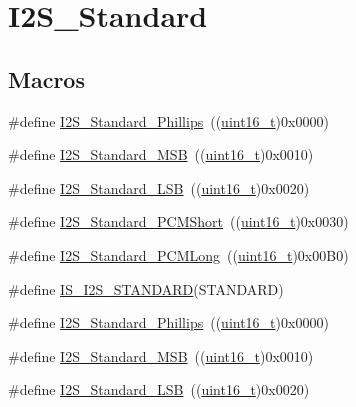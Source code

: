 \hypertarget{group___i2_s___standard}{}\section{I2\+S\+\_\+\+Standard}
\label{group___i2_s___standard}
\subsection*{Macros}
\begin{DoxyCompactItemize}
\item 
\#define \hyperlink{group___i2_s___standard_gacdb89d66a2a941924ff4b7a8d14884f9}{I2\+S\+\_\+\+Standard\+\_\+\+Phillips}~((\hyperlink{_p_e___types_8h_a1f1825b69244eb3ad2c7165ddc99c956}{uint16\+\_\+t})0x0000)
\item 
\#define \hyperlink{group___i2_s___standard_gae716cfa7e031affc37fe65dd80b0e6f4}{I2\+S\+\_\+\+Standard\+\_\+\+M\+SB}~((\hyperlink{_p_e___types_8h_a1f1825b69244eb3ad2c7165ddc99c956}{uint16\+\_\+t})0x0010)
\item 
\#define \hyperlink{group___i2_s___standard_ga88bc9001a13b95a0844d81fea2080df6}{I2\+S\+\_\+\+Standard\+\_\+\+L\+SB}~((\hyperlink{_p_e___types_8h_a1f1825b69244eb3ad2c7165ddc99c956}{uint16\+\_\+t})0x0020)
\item 
\#define \hyperlink{group___i2_s___standard_gaaf59e587048ff632037dfc9875ab4c7b}{I2\+S\+\_\+\+Standard\+\_\+\+P\+C\+M\+Short}~((\hyperlink{_p_e___types_8h_a1f1825b69244eb3ad2c7165ddc99c956}{uint16\+\_\+t})0x0030)
\item 
\#define \hyperlink{group___i2_s___standard_gaf79cb88702059506d876dbd776d7a136}{I2\+S\+\_\+\+Standard\+\_\+\+P\+C\+M\+Long}~((\hyperlink{_p_e___types_8h_a1f1825b69244eb3ad2c7165ddc99c956}{uint16\+\_\+t})0x00\+B0)
\item 
\#define \hyperlink{group___i2_s___standard_ga826b9ddb34520b8fa64c2b65c9bfd528}{I\+S\+\_\+\+I2\+S\+\_\+\+S\+T\+A\+N\+D\+A\+RD}(S\+T\+A\+N\+D\+A\+RD)
\item 
\#define \hyperlink{group___i2_s___standard_gacdb89d66a2a941924ff4b7a8d14884f9}{I2\+S\+\_\+\+Standard\+\_\+\+Phillips}~((\hyperlink{_p_e___types_8h_a1f1825b69244eb3ad2c7165ddc99c956}{uint16\+\_\+t})0x0000)
\item 
\#define \hyperlink{group___i2_s___standard_gae716cfa7e031affc37fe65dd80b0e6f4}{I2\+S\+\_\+\+Standard\+\_\+\+M\+SB}~((\hyperlink{_p_e___types_8h_a1f1825b69244eb3ad2c7165ddc99c956}{uint16\+\_\+t})0x0010)
\item 
\#define \hyperlink{group___i2_s___standard_ga88bc9001a13b95a0844d81fea2080df6}{I2\+S\+\_\+\+Standard\+\_\+\+L\+SB}~((\hyperlink{_p_e___types_8h_a1f1825b69244eb3ad2c7165ddc99c956}{uint16\+\_\+t})0x0020)

\end{DoxyCompactItemize}
